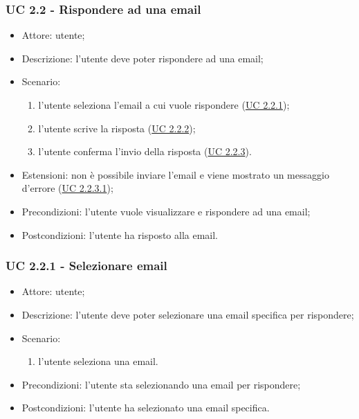     \subsubsection{UC 2.2 - Rispondere ad una email} \label{sec: UC 2.2}
    \begin{itemize}
        \item Attore: utente;
        \item Descrizione: l'utente deve poter rispondere ad una email;
        \item Scenario:
        \begin{enumerate}
        \item l'utente seleziona l'email a cui vuole rispondere (\hyperref[sec: UC 2.2.1]{UC 2.2.1});
        \item l'utente scrive la risposta (\hyperref[sec: UC 2.2.2]{UC 2.2.2});
        \item l'utente conferma l'invio della risposta (\hyperref[sec: UC 2.2.3]{UC 2.2.3}).
        \end{enumerate}
        \item Estensioni: non è possibile inviare l'email e viene mostrato un messaggio d'errore (\hyperref[sec: UC 2.2.3.1]{UC 2.2.3.1});
        \item Precondizioni: l'utente vuole visualizzare e rispondere ad una email;
        \item Postcondizioni: l'utente ha risposto alla email.
    \end{itemize}

    \subsubsection{UC 2.2.1 - Selezionare email} \label{sec: UC 2.2.1}
    \begin{itemize}
        \item Attore: utente;
        \item Descrizione: l'utente deve poter selezionare una email specifica per rispondere;
        \item Scenario:
        \begin{enumerate}
        \item l'utente seleziona una email.
        \end{enumerate}
        \item Precondizioni: l'utente sta selezionando una email per rispondere;
        \item Postcondizioni: l'utente ha selezionato una email specifica.
    \end{itemize}

